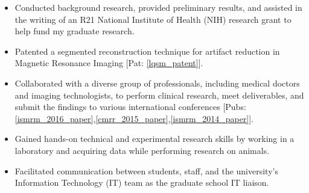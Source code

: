 \begin{minipage}{\textwidth}
	\begin{itemize}
		\item Conducted background research, provided preliminary results, and assisted in the writing of an R21 National Institute of Health (NIH) research grant to help fund my graduate research.
   		\item Patented a segmented reconstruction technique for artifact reduction in Magnetic Resonance Imaging [Pat: \ref{lqsm_patent}].
		\item Collaborated with a diverse group of professionals, including medical doctors and imaging technologists, to perform clinical research, meet deliverables, and submit the findings to various international conferences [Pubs: \ref{ismrm_2016_paper},\ref{cmrr_2015_paper},\ref{ismrm_2014_paper}].
		\item Gained hands-on technical and experimental research skills by working in a laboratory and acquiring data while performing research on animals.
		\item Facilitated communication between students, staff, and the university's Information Technology (IT) team as the graduate school IT liaison.
	\end{itemize}
\end{minipage}

